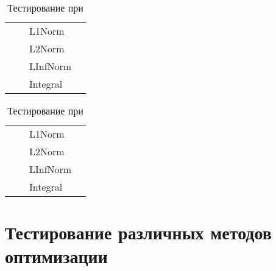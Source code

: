 \begin{table}
	\caption{Тестирование при }
	\centering
	\small
	\begin{tabularx}{1.0\textwidth}{| >{\raggedright\arraybackslash}X | >{\raggedright\arraybackslash}X | >{\raggedright\arraybackslash}X | >{\raggedright\arraybackslash}X |}
		\hline
		\centering{Входные точки}  & \centering{Функция} & \centering{Функционал} & \centering{Результат} \tabularnewline \hline    
		
		\multirow{4}{*}{\centering{(0.5; 0.5; 0.5)}} & \multirow{4}{*}{\centering{FFFFF}} & L1Norm & \centering{0.00000000E+000; 0.00000000E+000; 0.00000000E+000} \tabularnewline \cline{3-4}
		& & L2Norm & \centering{0.00000000E+000; 0.00000000E+000; 0.00000000E+000} \tabularnewline \cline{3-4}
		& & LInfNorm & \centering{0.00000000E+000; 0.00000000E+000; 0.00000000E+000} \tabularnewline \cline{3-4}
		& & Integral & \centering{0.00000000E+000; 0.00000000E+000; 0.00000000E+000} \tabularnewline \hline
	\end{tabularx}
	\label{tab:test9}
\end{table}

\begin{table}
	\caption{Тестирование при }
	\centering
	\small
	\begin{tabularx}{1.0\textwidth}{| >{\raggedright\arraybackslash}X | >{\raggedright\arraybackslash}X | >{\raggedright\arraybackslash}X | >{\raggedright\arraybackslash}X |}
		\hline
		\centering{Входные точки}  & \centering{Функция} & \centering{Функционал} & \centering{Результат} \tabularnewline \hline    
		
		\multirow{4}{*}{\centering{(0.5; 0.5; 0.5)}} & \multirow{4}{*}{\centering{FFFFF}} & L1Norm & \centering{0.00000000E+000; 0.00000000E+000; 0.00000000E+000} \tabularnewline \cline{3-4}
		& & L2Norm & \centering{0.00000000E+000; 0.00000000E+000; 0.00000000E+000} \tabularnewline \cline{3-4}
		& & LInfNorm & \centering{0.00000000E+000; 0.00000000E+000; 0.00000000E+000} \tabularnewline \cline{3-4}
		& & Integral & \centering{0.00000000E+000; 0.00000000E+000; 0.00000000E+000} \tabularnewline \hline
	\end{tabularx}
	\label{tab:test10}
\end{table}

\section{Тестирование различных методов оптимизации}